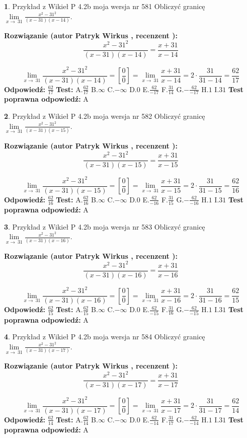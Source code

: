 \documentclass[12pt, a4paper]{article}
\theoremstyle{definition} %
\newtheorem{zad}{}
\newcommand{\zadStart}[1]{\begin{zad}#1\newline}
\newcommand{\zadStop}{\end{zad}}
\newcommand{\rozwStart}[2]{\noindent \textbf{Rozwiązanie (autor #1 , recenzent #2): }\newline}
\newcommand{\rozwStop}{\newline}
\newcommand{\odpStart}{\noindent \textbf{Odpowiedź:}\newline}
\newcommand{\odpStop}{\newline}
\newcommand{\testStart}{\noindent \textbf{Test:}\newline}
\newcommand{\testStop}{\newline}
\newcommand{\kluczStart}{\noindent \textbf{Test poprawna odpowiedź:}\newline}
\newcommand{\kluczStop}{\newline}
\begin{document}
\zadStart{Przykład z Wikieł P 4.2b moja wersja nr 581}
Obliczyć granicę $\lim\limits_{x\to\ 31}\frac{x^{2}-31^{2}}{(x-31)(x-14)}$.
\zadStop
\rozwStart{Patryk Wirkus}{}
$$\frac{x^{2}-31^{2}}{(x-31)(x-14)}=\frac{x+31}{x-14}$$

$$\lim\limits_{x\to\ 31}\frac{x^{2}-31^{2}}{(x-31)(x-14)}=[\frac{0}{0}]=\lim\limits_{x\to\ 31}\frac{x+31}{x-14}=2 \cdot \frac{31}{31-14} = \frac{62}{17}$$
\rozwStop
\odpStart
$\frac{62}{17}$
\odpStop
\testStart
A.$\frac{62}{17}$
B.$\infty$
C.$-\infty$
D.$0$
E.$\frac{62}{-17}$
F.$\frac{31}{14}$
G.$-\frac{62}{-17}$
H.$1$
I.$31$
\testStop
\kluczStart
A
\kluczStop



\zadStart{Przykład z Wikieł P 4.2b moja wersja nr 582}
Obliczyć granicę $\lim\limits_{x\to\ 31}\frac{x^{2}-31^{2}}{(x-31)(x-15)}$.
\zadStop
\rozwStart{Patryk Wirkus}{}
$$\frac{x^{2}-31^{2}}{(x-31)(x-15)}=\frac{x+31}{x-15}$$

$$\lim\limits_{x\to\ 31}\frac{x^{2}-31^{2}}{(x-31)(x-15)}=[\frac{0}{0}]=\lim\limits_{x\to\ 31}\frac{x+31}{x-15}=2 \cdot \frac{31}{31-15} = \frac{62}{16}$$
\rozwStop
\odpStart
$\frac{62}{16}$
\odpStop
\testStart
A.$\frac{62}{16}$
B.$\infty$
C.$-\infty$
D.$0$
E.$\frac{62}{-16}$
F.$\frac{31}{15}$
G.$-\frac{62}{-16}$
H.$1$
I.$31$
\testStop
\kluczStart
A
\kluczStop



\zadStart{Przykład z Wikieł P 4.2b moja wersja nr 583}
Obliczyć granicę $\lim\limits_{x\to\ 31}\frac{x^{2}-31^{2}}{(x-31)(x-16)}$.
\zadStop
\rozwStart{Patryk Wirkus}{}
$$\frac{x^{2}-31^{2}}{(x-31)(x-16)}=\frac{x+31}{x-16}$$

$$\lim\limits_{x\to\ 31}\frac{x^{2}-31^{2}}{(x-31)(x-16)}=[\frac{0}{0}]=\lim\limits_{x\to\ 31}\frac{x+31}{x-16}=2 \cdot \frac{31}{31-16} = \frac{62}{15}$$
\rozwStop
\odpStart
$\frac{62}{15}$
\odpStop
\testStart
A.$\frac{62}{15}$
B.$\infty$
C.$-\infty$
D.$0$
E.$\frac{62}{-15}$
F.$\frac{31}{16}$
G.$-\frac{62}{-15}$
H.$1$
I.$31$
\testStop
\kluczStart
A
\kluczStop



\zadStart{Przykład z Wikieł P 4.2b moja wersja nr 584}
Obliczyć granicę $\lim\limits_{x\to\ 31}\frac{x^{2}-31^{2}}{(x-31)(x-17)}$.
\zadStop
\rozwStart{Patryk Wirkus}{}
$$\frac{x^{2}-31^{2}}{(x-31)(x-17)}=\frac{x+31}{x-17}$$

$$\lim\limits_{x\to\ 31}\frac{x^{2}-31^{2}}{(x-31)(x-17)}=[\frac{0}{0}]=\lim\limits_{x\to\ 31}\frac{x+31}{x-17}=2 \cdot \frac{31}{31-17} = \frac{62}{14}$$
\rozwStop
\odpStart
$\frac{62}{14}$
\odpStop
\testStart
A.$\frac{62}{14}$
B.$\infty$
C.$-\infty$
D.$0$
E.$\frac{62}{-14}$
F.$\frac{31}{17}$
G.$-\frac{62}{-14}$
H.$1$
I.$31$
\testStop
\kluczStart
A
\kluczStop
\end{document}
